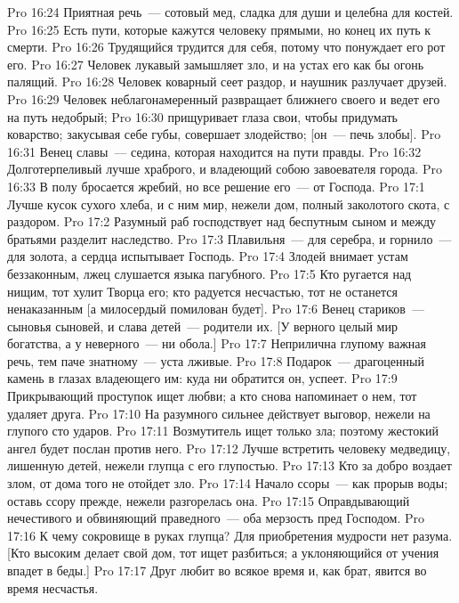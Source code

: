 \vs Pro 16:24 Приятная речь~--- сотовый мед, сладка для души и целебна для костей.
\vs Pro 16:25 Есть пути, которые кажутся человеку прямыми, но конец их путь к смерти.
\vs Pro 16:26 Трудящийся трудится для себя, потому что понуждает его  рот его.
\vs Pro 16:27 Человек лукавый замышляет зло, и на устах его как бы огонь палящий.
\vs Pro 16:28 Человек коварный сеет раздор, и наушник разлучает друзей.
\vs Pro 16:29 Человек неблагонамеренный развращает ближнего своего и ведет его на путь недобрый;
\vs Pro 16:30 прищуривает глаза свои, чтобы придумать коварство; закусывая себе губы, совершает злодейство; [он~--- печь злобы].
\vs Pro 16:31 Венец славы~--- седина, которая находится на пути правды.
\vs Pro 16:32 Долготерпеливый лучше храброго, и владеющий собою  завоевателя города.
\vs Pro 16:33 В полу бросается жребий, но все решение его~--- от Господа.
\vs Pro 17:1 Лучше кусок сухого хлеба, и с ним мир, нежели дом, полный заколотого скота, с раздором.
\vs Pro 17:2 Разумный раб господствует над беспутным сыном и между братьями разделит наследство.
\vs Pro 17:3 Плавильня~--- для серебра, и горнило~--- для золота, а сердца испытывает Господь.
\vs Pro 17:4 Злодей внимает устам беззаконным, лжец слушается языка пагубного.
\vs Pro 17:5 Кто ругается над нищим, тот хулит Творца его; кто радуется несчастью, тот не останется ненаказанным [а милосердый помилован будет].
\vs Pro 17:6 Венец стариков~--- сыновья сыновей, и слава детей~--- родители их. [У верного целый мир богатства, а у неверного~--- ни обола.]
\vs Pro 17:7 Неприлична глупому важная речь, тем паче знатному~--- уста лживые.
\vs Pro 17:8 Подарок~--- драгоценный камень в глазах владеющего им: куда ни обратится он, успеет.
\vs Pro 17:9 Прикрывающий проступок ищет любви; а кто снова напоминает о нем, тот удаляет друга.
\vs Pro 17:10 На разумного сильнее действует выговор, нежели на глупого сто ударов.
\vs Pro 17:11 Возмутитель ищет только зла; поэтому жестокий ангел будет послан против него.
\vs Pro 17:12 Лучше встретить человеку медведицу, лишенную детей, нежели глупца с его глупостью.
\vs Pro 17:13 Кто за добро воздает злом, от дома того не отойдет зло.
\vs Pro 17:14 Начало ссоры~--- как прорыв воды; оставь ссору прежде, нежели разгорелась она.
\vs Pro 17:15 Оправдывающий нечестивого и обвиняющий праведного~--- оба мерзость пред Господом.
\vs Pro 17:16 К чему сокровище в руках глупца? Для приобретения мудрости  нет разума. [Кто высоким делает свой дом, тот ищет разбиться; а уклоняющийся от учения впадет в беды.]
\vs Pro 17:17 Друг любит во всякое время и, как брат, явится во время несчастья.
